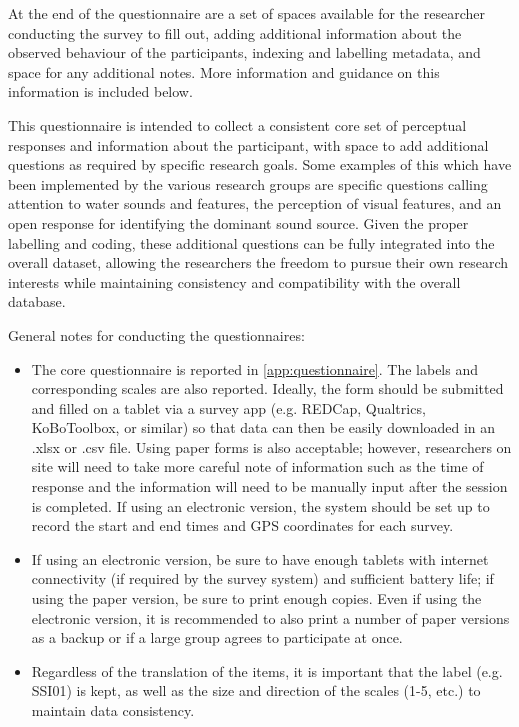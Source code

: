    At the end of the questionnaire are a set of spaces available for the researcher conducting the survey to fill out, adding additional information about the observed behaviour of the participants, indexing and labelling metadata, and space for any additional notes. More information and guidance on this information is included below.

   This questionnaire is intended to collect a consistent core set of perceptual responses and information about the participant, with space to add additional questions as required by specific research goals. Some examples of this which have been implemented by the various research groups are specific questions calling attention to water sounds and features, the perception of visual features, and an open response for identifying the dominant sound source. Given the proper labelling and coding, these additional questions can be fully integrated into the overall dataset, allowing the researchers the freedom to pursue their own research interests while maintaining consistency and compatibility with the overall database.

   General notes for conducting the questionnaires:

   \begin{itemize}
     \item The core questionnaire is reported in \cref{app:questionnaire}. The labels and corresponding scales are also reported. Ideally, the form should be submitted and filled on a tablet via a survey app (e.g. REDCap, Qualtrics, KoBoToolbox, or similar) so that data can then be easily downloaded in an .xlsx or .csv file. Using paper forms is also acceptable; however, researchers on site will need to take more careful note of information such as the time of response and the information will need to be manually input after the session is completed. If using an electronic version, the system should be set up to record the start and end times and GPS coordinates for each survey.
     \item If using an electronic version, be sure to have enough tablets with internet connectivity (if required by the survey system) and sufficient battery life; if using the paper version, be sure to print enough copies. Even if using the electronic version, it is recommended to also print a number of paper versions as a backup or if a large group agrees to participate at once.
     \item Regardless of the translation of the items, it is important that the label (e.g. SSI01) is kept, as well as the size and direction of the scales (1-5, etc.) to maintain data consistency.
   \end{itemize}



